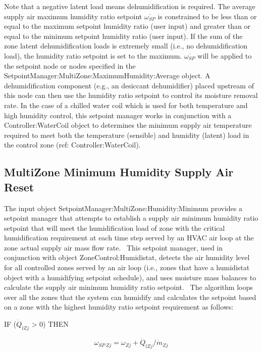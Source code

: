 Note that a negative latent load means dehumidification is required. The average supply air maximum humidity ratio setpoint \({\overline{\omega_{SP}}}\) is constrained to be less than or equal to the maximum setpoint humidity ratio (user input) and greater than or equal to the minimum setpoint humidity ratio (user input). If the sum of the zone latent dehumidification loads is extremely small (i.e., no dehumidification load), the humidity ratio setpoint is set to the maximum. \({\overline{\omega_{SP}}}\) will be applied to the setpoint node or nodes specified in the SetpointManager:MultiZone:MaximumHumidity:Average object. A dehumidification component (e.g., an desiccant dehumidifier) placed upstream of this node can then use the humidity ratio setpoint to control its moisture removal rate. In the case of a chilled water coil which is used for both temperature and high humidity control, this setpoint manager works in conjunction with a Controller:WaterCoil object to determines the minimum supply air temperature required to meet both the temperature (sensible) and humidity (latent) load in the control zone (ref: Controller:WaterCoil).

\subsection{MultiZone Minimum Humidity Supply Air Reset}\label{multizone-minimum-humidity-supply-air-reset}

The input object SetpointManager:MultiZone:Humidity:Minimum provides a setpoint manager that attempts to establish a supply air minimum humidity ratio setpoint that will meet the humidification load of zone with the critical humidification requirement at each time step served by an HVAC air loop at the zone actual supply air mass flow rate.~ This setpoint manager, used in conjunction with object ZoneControl:Humidistat, detects the air humidity level for all controlled zones served by an air loop (i.e., zones that have a humidistat object with a humidifying setpoint schedule), and uses moisture mass balances to calculate the supply air minimum humidity ratio setpoint.~ The algorithm loops over all the zones that the system can humidify and calculates the setpoint based on a zone with the highest humidity ratio setpoint requirement as follows:

IF (\({\dot Q_{lZj}}\) \textgreater{} 0) THEN

\begin{equation}
{\omega_{SP~Zj}} = {\omega_{Zj}} + {{{\dot Q}_{lZj}} / {{\dot m}_{Zj}}}
\end{equation}

